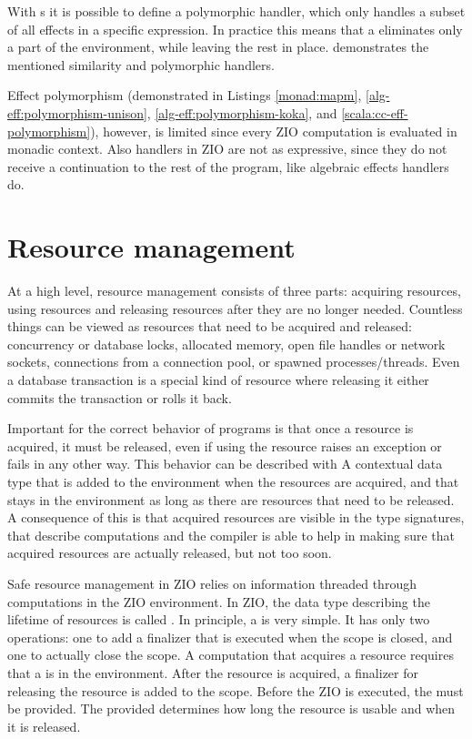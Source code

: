 With s it is possible to define a polymorphic handler, which only handles a subset of all effects in a specific expression. In practice this means that a  eliminates only a part of the environment, while leaving the rest in place.  demonstrates the mentioned similarity and polymorphic handlers.



Effect polymorphism (demonstrated in Listings \ref{monad:mapm}, \ref{alg-eff:polymorphism-unison}, \ref{alg-eff:polymorphism-koka}, and \ref{scala:cc-eff-polymorphism}), however, is limited since every ZIO computation is evaluated in monadic context. Also handlers in ZIO are not as expressive, since they do not receive a continuation to the rest of the program, like algebraic effects handlers do.


\section{Resource management} \label{zio:resource-management}
At a high level, resource management consists of three parts: acquiring resources, using resources and releasing resources after they are no longer needed. Countless things can be viewed as resources that need to be acquired and released: concurrency or database locks, allocated memory, open file handles or network sockets, connections from a connection pool, or spawned processes/threads. Even a database transaction is a special kind of resource where releasing it either commits the transaction or rolls it back.

Important for the correct behavior of programs is that once a resource is acquired, it must be released, even if using the resource raises an exception or fails in any other way. This behavior can be described with A contextual data type that is added to the environment when the resources are acquired, and that stays in the environment as long as there are resources that need to be released. A consequence of this is that acquired resources are visible in the type signatures, that describe computations and the compiler is able to help in making sure that acquired resources are actually released, but not too soon.

Safe resource management in ZIO relies on information threaded through computations in the ZIO environment. In ZIO, the data type describing the lifetime of resources is called . In principle, a  is very simple. It has only two operations: one to add a finalizer that is executed when the scope is closed, and one to actually close the scope. A computation that acquires a resource requires that a  is in the environment. After the resource is acquired, a finalizer for releasing the resource is added to the scope. Before the ZIO is executed, the  must be provided. The provided  determines how long the resource is usable and when it is released. 


